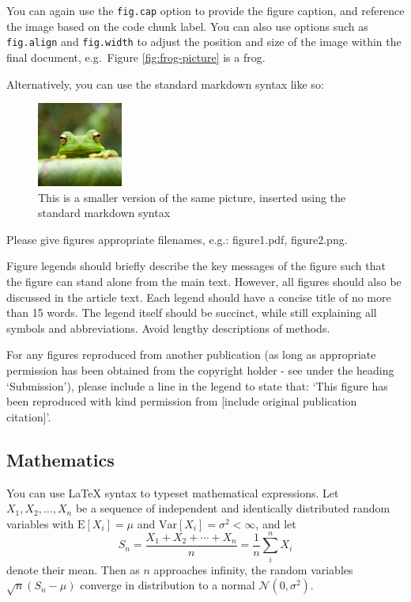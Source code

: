 \documentclass[9pt,a4paper,]{extarticle}
\begin{document}
You can again use the \texttt{fig.cap} option to provide the figure caption, and reference the image based on the code chunk label. You can also use options such as \texttt{fig.align} and \texttt{fig.width} to adjust the position and size of the image within the final document, e.g.~Figure \ref{fig:frog-picture} is a frog.

Alternatively, you can use the standard markdown syntax like so:

\begin{figure}
\centering
\includegraphics[width=0.25\textwidth,height=\textheight]{frog.jpg}
\caption{This is a smaller version of the same picture, inserted using the standard markdown syntax}
\end{figure}

Please give figures appropriate filenames, e.g.: figure1.pdf, figure2.png.

Figure legends should briefly describe the key messages of the figure such that the figure can stand alone from the main text. However, all figures should also be discussed in the article text. Each legend should have a concise title of no more than 15 words. The legend itself should be succinct, while still explaining all symbols and abbreviations. Avoid lengthy descriptions of methods.

For any figures reproduced from another publication (as long as appropriate permission has been obtained from the copyright holder - see under the heading `Submission'), please include a line in the legend to state that: `This figure has been reproduced with kind permission from {[}include original publication citation{]}'.

\hypertarget{mathematics}{%
\subsection{Mathematics}\label{mathematics}}

You can use LaTeX syntax to typeset mathematical expressions. Let \(X_1, X_2, \ldots, X_n\) be a sequence of independent and identically distributed random variables with \(\text{E}[X_i] = \mu\) and \(\text{Var}[X_i] = \sigma^2 < \infty\), and let
\[S_n = \frac{X_1 + X_2 + \cdots + X_n}{n}
      = \frac{1}{n}\sum_{i}^{n} X_i\]
denote their mean. Then as \(n\) approaches infinity, the random variables \(\sqrt{n}(S_n - \mu)\) converge in distribution to a normal \(\mathcal{N}(0, \sigma^2)\).
\end{document}
